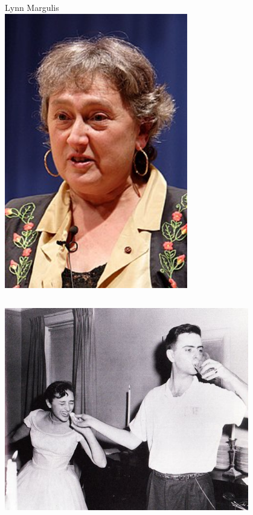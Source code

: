 \documentclass[10pt]{beamer}
\begin{document}
\begin{frame}[t]
\begin{columns}[t]
		\begin{column}{0.5\textwidth}
			\begin{center}
				Lynn Margulis\\
				\vspace{0.25cm}
				\includegraphics[width=0.6\textwidth]{figures/Margulis.jpg}
			\end{center}
		\end{column}
	\end{columns}
\end{frame}


\begin{frame}

	\begin{center}
		\includegraphics[width=0.8\textwidth]{figures/lynn-carl.jpg}
	\end{center}
\end{frame}
\end{document}
